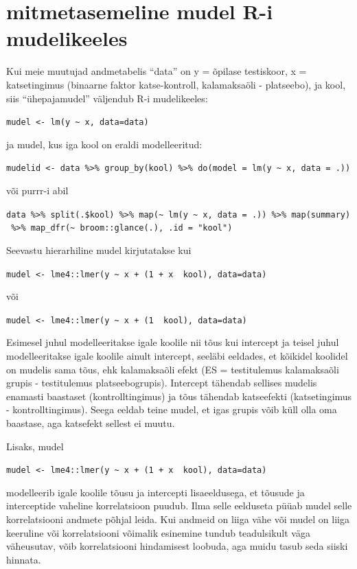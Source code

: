 \documentclass[]{book}
\begin{document}
\hypertarget{mitmetasemeline-mudel-r-i-mudelikeeles}{%
\section{mitmetasemeline mudel R-i mudelikeeles}\label{mitmetasemeline-mudel-r-i-mudelikeeles}}

Kui meie muutujad andmetabelis ``data'' on y = õpilase testiskoor, x = katsetingimus (binaarne faktor katse-kontroll, kalamaksaöli - platseebo), ja kool, siis ``ühepajamudel'' väljendub R-i mudelikeeles:

\texttt{mudel\ \textless{}-\ lm(y\ \textasciitilde{}\ x,\ data=data)}

ja mudel, kus iga kool on eraldi modelleeritud:

\texttt{mudelid\ \textless{}-\ data\ \%\textgreater{}\%\ group\_by(kool)\ \%\textgreater{}\%\ do(model\ =\ lm(y\ \textasciitilde{}\ x,\ data\ =\ .))}

või purrr-i abil

\texttt{data\ \%\textgreater{}\%\ split(.\$kool)\ \%\textgreater{}\%\ map(\textasciitilde{}\ lm(y\ \textasciitilde{}\ x,\ data\ =\ .))\ \%\textgreater{}\%\ map(summary)\ \%\textgreater{}\%\ map\_dfr(\textasciitilde{}\ broom::glance(.),\ .id\ =\ "kool")}

Seevastu hierarhiline mudel kirjutatakse kui

\texttt{mudel\ \textless{}-\ lme4::lmer(y\ \textasciitilde{}\ x\ +\ (1\ +\ x\ \textbar{}\ kool),\ data=data)}

või

\texttt{mudel\ \textless{}-\ lme4::lmer(y\ \textasciitilde{}\ x\ +\ (1\ \textbar{}\ kool),\ data=data)}

Esimesel juhul modelleeritakse igale koolile nii tõus kui intercept ja teisel juhul modelleeritakse igale koolile ainult intercept, seeläbi eeldades, et kõikidel koolidel on mudelis sama tõus, ehk kalamaksaõli efekt (ES = testitulemus kalamaksaõli grupis - testitulemus platseebogrupis). Intercept tähendab sellises mudelis enamasti baastaset (kontrolltingimus) ja tõus tähendab katseefekti (katsetingimus - kontrolltingimus). Seega eeldab teine mudel, et igas grupis võib küll olla oma baastase, aga katsefekt sellest ei muutu.

Lisaks, mudel

\texttt{mudel\ \textless{}-\ lme4::lmer(y\ \textasciitilde{}\ x\ +\ (1\ +\ x\ \textbar{}\textbar{}\ kool),\ data=data)}

modelleerib igale koolile tõusu ja intercepti lisaeeldusega, et tõusude ja interceptide vaheline korrelatsioon puudub. Ilma selle eelduseta püüab mudel selle korrelatsiooni andmete põhjal leida. Kui andmeid on liiga vähe või mudel on liiga keeruline või korrelatsiooni võimalik esinemine tundub teadulsikult väga väheusutav, võib korrelatsiooni hindamisest loobuda, aga muidu tasub seda siiski hinnata.
\end{document}
